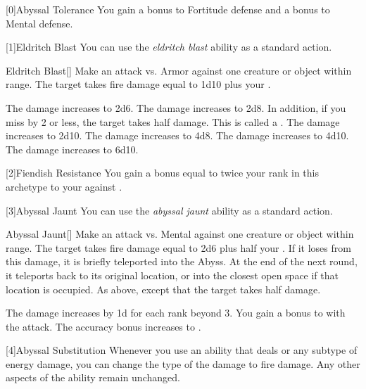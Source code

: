        [0]{Abyssal Tolerance} You gain a  bonus to Fortitude defense and a  bonus to Mental defense.

        [1]{Eldritch Blast} You can use the \textit{eldritch blast} ability as a standard action.
        \begin{freeability}{Eldritch Blast}[]
            Make an attack vs. Armor against one creature or object within \rngmed range.
            \hit The target takes fire damage equal to 1d10 plus your .

            \rankline
             The damage increases to 2d6.
             The damage increases to 2d8.
                In addition, if you miss by 2 or less, the target takes half damage.
                This is called a .
             The damage increases to 2d10.
             The damage increases to 4d8.
             The damage increases to 4d10.
             The damage increases to 6d10.
        \end{freeability}

        [2]{Fiendish Resistance} You gain a bonus equal to twice your rank in this archetype to your  against .

        [3]{Abyssal Jaunt} You can use the \textit{abyssal jaunt} ability as a standard action.
        \begin{freeability}{Abyssal Jaunt}[]
            Make an attack vs. Mental against one creature or object within \rngshort range.
            \hit The target takes fire damage equal to 2d6 plus half your .
            If it loses  from this damage, it is briefly teleported into the Abyss.
            At the end of the next round, it teleports back to its original location, or into the closest open space if that location is occupied.
            \glance As above, except that the target takes half damage.

            \rankline
            The damage increases by \plus1d for each rank beyond 3.
             You gain a  bonus to  with the attack.
             The accuracy bonus increases to .
        \end{freeability}

        [4]{Abyssal Substitution} Whenever you use an ability that deals  or any subtype of energy damage, you can change the type of the damage to fire damage.
        Any other aspects of the ability remain unchanged.

